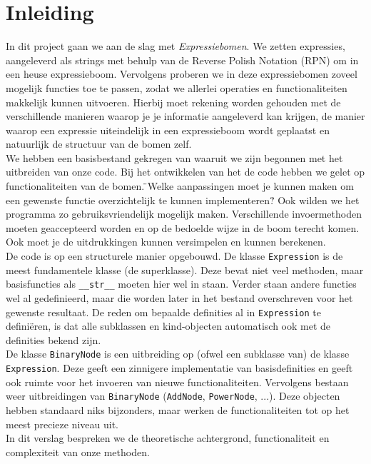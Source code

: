\documentclass[12pt]{article}
\begin{document}
\section{Inleiding}
In dit project gaan we aan de slag met \textit{Expressiebomen}. We zetten expressies, aangeleverd als strings met behulp van de Reverse Polish Notation (RPN) om in een heuse expressieboom. Vervolgens proberen we in deze expressiebomen zoveel mogelijk functies toe te passen, zodat we allerlei operaties en functionaliteiten makkelijk kunnen uitvoeren. Hierbij moet rekening worden gehouden met de verschillende manieren waarop je je informatie aangeleverd kan krijgen, de manier waarop een expressie uiteindelijk in een expressieboom wordt geplaatst en natuurlijk de structuur van de bomen zelf. \\ \newline
We hebben een basisbestand gekregen van waaruit we zijn begonnen met het uitbreiden van onze code. Bij het ontwikkelen van het de code hebben we gelet op functionaliteiten van de bomen. \"{}Welke aanpassingen moet je kunnen maken om een gewenste functie overzichtelijk te kunnen implementeren?\"{} Ook wilden we het programma zo gebruiksvriendelijk mogelijk maken. Verschillende invoermethoden moeten geaccepteerd worden en op de bedoelde wijze in de boom terecht komen. Ook moet je de uitdrukkingen kunnen versimpelen en kunnen berekenen. \\ \newline
De code is op een structurele manier opgebouwd. De klasse \texttt{Expression} is de meest fundamentele klasse (de superklasse). Deze bevat niet veel methoden, maar basisfuncties als \texttt{\_\_str\_\_} moeten hier wel in staan. Verder staan andere functies wel al gedefinieerd, maar die worden later in het bestand overschreven voor het gewenste resultaat. De reden om bepaalde definities al in \texttt{Expression} te defini\"{e}ren, is dat alle subklassen en kind-objecten automatisch ook met de definities bekend zijn. \\
De klasse \texttt{BinaryNode} is een uitbreiding op (ofwel een subklasse van) de klasse \texttt{Expression}. Deze geeft een zinnigere implementatie van basisdefinities en geeft ook ruimte voor het invoeren van nieuwe functionaliteiten. Vervolgens bestaan weer uitbreidingen van \texttt{BinaryNode} (\texttt{AddNode}, \texttt{PowerNode}, ...). Deze objecten hebben standaard niks bijzonders, maar werken de functionaliteiten tot op het meest precieze niveau uit. \\ \newline 
In dit verslag bespreken we de theoretische achtergrond, functionaliteit en complexiteit van onze methoden.
\newpage
\end{document}
